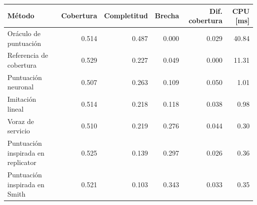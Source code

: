 \begin{tabular}{lrrrrr}
\toprule
Método & Cobertura & Completitud & Brecha & Dif. cobertura & CPU [ms] \\
\midrule
Oráculo de puntuación & 0.514 & 0.487 & 0.000 & 0.029 & 40.84 \\
Referencia de cobertura & 0.529 & 0.227 & 0.049 & 0.000 & 11.31 \\
Puntuación neuronal & 0.507 & 0.263 & 0.109 & 0.050 & 1.01 \\
Imitación lineal & 0.514 & 0.218 & 0.118 & 0.038 & 0.98 \\
Voraz de servicio & 0.510 & 0.219 & 0.276 & 0.044 & 0.30 \\
Puntuación inspirada en replicator & 0.525 & 0.139 & 0.297 & 0.026 & 0.36 \\
Puntuación inspirada en Smith & 0.521 & 0.103 & 0.343 & 0.033 & 0.35 \\
\bottomrule
\end{tabular}
